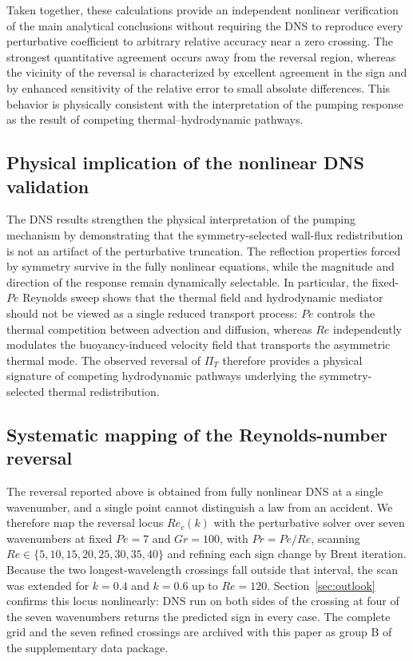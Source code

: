 \documentclass[12pt,a4paper]{article}
\newcommand{\Rey}{\mathit{Re}}
\newcommand{\Pe}{\mathit{Pe}}
\newcommand{\Grr}{\mathit{Gr}}
\renewcommand{\Pr}{\mathit{Pr}}
\newcommand{\PiT}{\Pi_T}
\begin{document}
Taken together, these calculations provide an independent nonlinear
verification of the main analytical conclusions without requiring the DNS to
reproduce every perturbative coefficient to arbitrary relative accuracy near
a zero crossing. The strongest quantitative agreement occurs away from the
reversal region, whereas the vicinity of the reversal is characterized by
excellent agreement in the sign and by enhanced sensitivity of the relative
error to small absolute differences. This behavior is physically consistent
with the interpretation of the pumping response as the result of competing
thermal--hydrodynamic pathways.

\subsection{Physical implication of the nonlinear DNS validation}
\label{subsec:dns_physical_implication}

The DNS results strengthen the physical interpretation of the pumping mechanism
by demonstrating that the symmetry-selected wall-flux redistribution is not an
artifact of the perturbative truncation. The reflection properties forced by symmetry survive
in the fully nonlinear equations, while the magnitude and direction of the
response remain dynamically selectable. In particular, the fixed-$\Pe$
Reynolds sweep shows that the thermal field and hydrodynamic mediator should
not be viewed as a single reduced transport process: $\Pe$ controls the thermal
competition between advection and diffusion, whereas $\Rey$ independently
modulates the buoyancy-induced velocity field that transports the asymmetric
thermal mode. The observed reversal of $\PiT$ therefore provides a physical
signature of competing hydrodynamic pathways underlying the symmetry-selected
thermal redistribution.

\subsection{Systematic mapping of the Reynolds-number reversal}
\label{sec:reversal}

The reversal reported above is obtained from fully nonlinear DNS at a single
wavenumber, and a single point cannot distinguish a law from an accident. We therefore
map the reversal locus $\Rey_c(k)$ with the perturbative solver over
seven wavenumbers at fixed $\Pe=7$ and $\Grr=100$, with $\Pr=\Pe/\Rey$, scanning
$\Rey\in\{5,10,15,20,25,30,35,40\}$ and refining each sign change by Brent
iteration. Because the two longest-wavelength crossings fall outside that
interval, the scan was extended for $k=0.4$ and $k=0.6$ up to $\Rey=120$.
Section~\ref{sec:outlook} confirms this locus nonlinearly: DNS run on both sides
of the crossing at four of the seven wavenumbers returns the predicted sign in
every case.
The complete grid and the seven refined crossings are archived with this paper as
group B of the supplementary data package.
\end{document}
